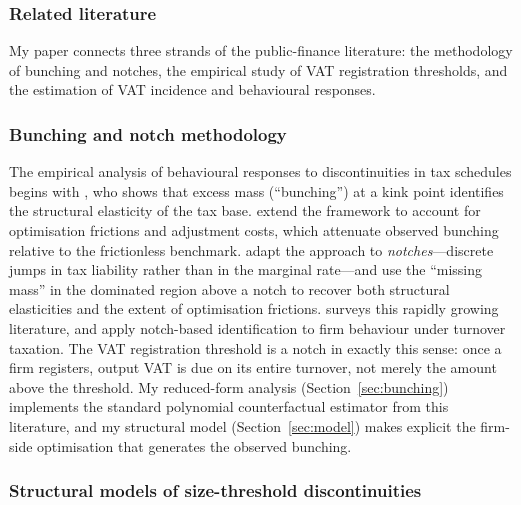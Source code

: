 \subsubsection{Related literature}
\label{sec:literature}

My paper connects three strands of the public-finance literature: the methodology of
bunching and notches, the empirical study of VAT registration thresholds, and the
estimation of VAT incidence and behavioural responses.

\subsubsection{Bunching and notch methodology}

The empirical analysis of behavioural responses to discontinuities in tax schedules
begins with \citet{saez2010}, who shows that excess mass (``bunching'') at a kink point
identifies the structural elasticity of the tax base. \citet{chettyetal2011} extend the
framework to account for optimisation frictions and adjustment costs, which attenuate
observed bunching relative to the frictionless benchmark. \citet{klevenwaseem2013} adapt
the approach to \emph{notches}---discrete jumps in tax liability rather than in the
marginal rate---and use the ``missing mass'' in the dominated region above a notch to
recover both structural elasticities and the extent of optimisation frictions.
\citet{kleven2016} surveys this rapidly growing literature, and \citet{best2015} apply
notch-based identification to firm behaviour under turnover taxation. The VAT
registration threshold is a notch in exactly this sense: once a firm registers, output
VAT is due on its entire turnover, not merely the amount above the threshold. My
reduced-form analysis (Section~\ref{sec:bunching}) implements the standard polynomial
counterfactual estimator from this literature, and my structural model
(Section~\ref{sec:model}) makes explicit the firm-side optimisation that generates the
observed bunching.

\subsubsection{Structural models of size-threshold discontinuities}

